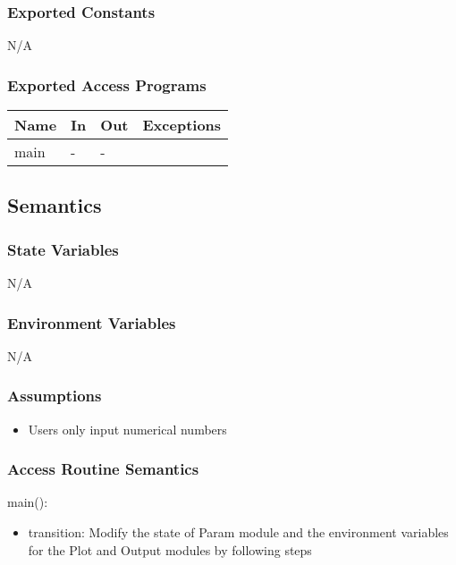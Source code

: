 \documentclass[12pt, titlepage]{article}
\begin{document}
\subsubsection{Exported Constants}

N/A
\subsubsection{Exported Access Programs}

\begin{center}
\begin{tabular}{p{4cm} p{2cm} p{2cm} p{6cm}}
\hline
\textbf{Name} & \textbf{In} & \textbf{Out} & \textbf{Exceptions} \\
\hline
main & - & - &  \\
\hline
\end{tabular}
\end{center}

\subsection{Semantics}

\subsubsection{State Variables}
N/A

\subsubsection{Environment Variables}
N/A

\subsubsection{Assumptions}
\begin{itemize}
  \item Users only input numerical numbers
\end{itemize}

\subsubsection{Access Routine Semantics}

\noindent main():
\begin{itemize}
\item transition: Modify the state of Param module and the environment variables for the Plot and Output modules by following steps\\
\end{itemize}
\end{document}

